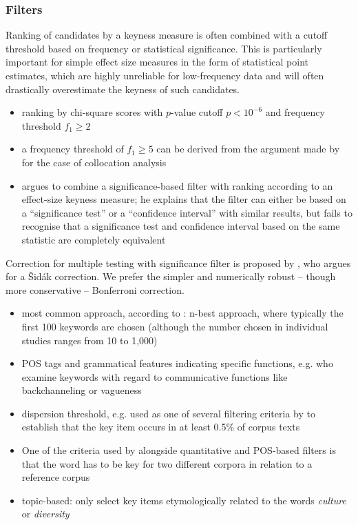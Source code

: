 \documentclass[a4paper]{article}
\begin{document}
\subsubsection{Filters}
\label{sec:math:filter}

Ranking of candidates by a keyness measure is often combined with a cutoff threshold based on frequency or statistical significance.  This is particularly important for simple effect size measures in the form of statistical point estimates, which are highly unreliable for low-frequency data and will often drastically overestimate the keyness of such candidates.

\begin{itemize}
\item ranking by chi-square scores with $p$-value cutoff $p < 10^{-6}$ and frequency threshold $f_1 \geq 2$ \citep[237]{Scott:97}
\item a frequency threshold of $f_1 \geq 5$ can be derived from the argument made by \citet[133]{Evert:04phd} for the case of collocation analysis
\item \citet[48--50]{Hardie:14} argues to combine a significance-based filter with ranking according to an effect-size keyness measure; he explains that the filter can either be based on a ``significance test'' or a ``confidence interval'' with similar results, but fails to recognise that a significance test and confidence interval based on the same statistic are completely equivalent
\end{itemize}

Correction for multiple testing with significance filter is proposed by \citet[51--52]{Hardie:14}, who argues for a Šidák correction. We prefer the simpler and numerically robust -- though more conservative -- Bonferroni correction.


\begin{itemize}
	\item most common approach, according to \citet[3-10]{Pojanapunya:WatsonTodd:18}: n-best approach, where typically the first 100 keywords are chosen (although the number chosen in individual studies ranges from 10 to 1,000)
	\item POS tags and grammatical features indicating specific functions, e.g. \citep{Adolphs:07} who examine keywords with regard to communicative functions like backchanneling or vagueness
	\item dispersion threshold, e.g. used as one of several filtering criteria by \citet{Leedham:20} to establish that the key item occurs in at least 0.5\% of corpus texts
	\item One of the criteria used by \citet{Kania:20} alongside quantitative and POS-based filters is that the word has to be key for two different corpora in relation to a reference corpus
	\item topic-based: \citet{Handford:19} only select key items etymologically related to the words \textit{culture} or \textit{diversity}
\end{itemize}
\end{document}
